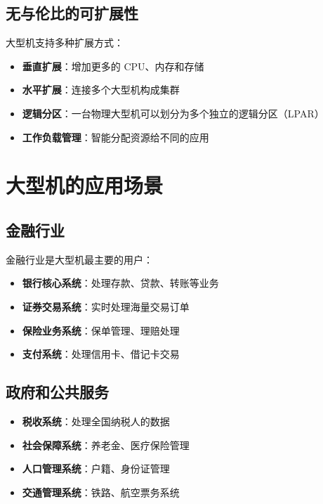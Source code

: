 \documentclass[12pt,UTF8]{ctexbook}
\begin{document}
\section{无与伦比的可扩展性}

大型机支持多种扩展方式：

\begin{itemize}[leftmargin=2cm]
    \item \textbf{垂直扩展}：增加更多的 CPU、内存和存储
    \item \textbf{水平扩展}：连接多个大型机构成集群
    \item \textbf{逻辑分区}：一台物理大型机可以划分为多个独立的逻辑分区（LPAR）
    \item \textbf{工作负载管理}：智能分配资源给不同的应用
\end{itemize}

\chapter{大型机的应用场景}
\label{chap:applications}

\section{金融行业}

金融行业是大型机最主要的用户：

\begin{itemize}[leftmargin=2cm]
    \item \textbf{银行核心系统}：处理存款、贷款、转账等业务
    \item \textbf{证券交易系统}：实时处理海量交易订单
    \item \textbf{保险业务系统}：保单管理、理赔处理
    \item \textbf{支付系统}：处理信用卡、借记卡交易
\end{itemize}

\section{政府和公共服务}

\begin{itemize}[leftmargin=2cm]
    \item \textbf{税收系统}：处理全国纳税人的数据
    \item \textbf{社会保障系统}：养老金、医疗保险管理
    \item \textbf{人口管理系统}：户籍、身份证管理
    \item \textbf{交通管理系统}：铁路、航空票务系统
\end{itemize}
\end{document}
